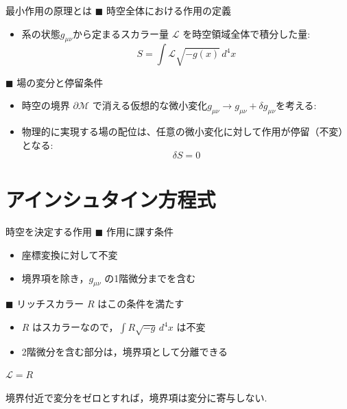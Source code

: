 \documentclass[unicode, aspectratio=169, 12pt]{beamer}
\begin{document}
\begin{frame}{最小作用の原理とは}
    $\blacksquare$ 時空全体における作用の定義
    \begin{itemize}
        \item 系の状態$g_{\mu\nu}$から定まるスカラー量 $\mathcal{L}$ を時空領域全体で積分した量:
        \begin{equation*}
            S = \int \mathcal{L} \sqrt{-g(x)} \, d^4x
        \end{equation*}
    \end{itemize}

    \vspace{0.4em}
    $\blacksquare$ 場の変分と停留条件
    \begin{itemize}
        \item 時空の境界 $\partial \mathcal{M}$ で消える仮想的な微小変化$g_{\mu\nu}\to g_{\mu\nu}+\delta g_{\mu\nu}$を考える:
        \item 物理的に実現する場の配位は、任意の微小変化に対して作用が停留（不変）となる:
        \begin{equation*}
            \delta S = 0
        \end{equation*}
    \end{itemize}
\end{frame}

\section{アインシュタイン方程式}

\begin{frame}{時空を決定する作用}
    $\blacksquare$ 作用に課す条件
    \begin{itemize}
        \item 座標変換に対して不変
        \item 境界項を除き，$g_{\mu\nu}$ の1階微分までを含む
    \end{itemize}

    \vspace{0.6em}
    $\blacksquare$ リッチスカラー $R$ はこの条件を満たす
    \begin{itemize}
        \item $R$ はスカラーなので，$\int R\sqrt{-g}\,d^4x$ は不変
        \item 2階微分を含む部分は，境界項として分離できる
    \end{itemize}

    \vspace{0.4em}
    \begin{center}
        $\displaystyle \boxed{\mathcal{L}=R}$
    \end{center}
    {\footnotesize 境界付近で変分をゼロとすれば，境界項は変分に寄与しない.}
\end{frame}
\end{document}
